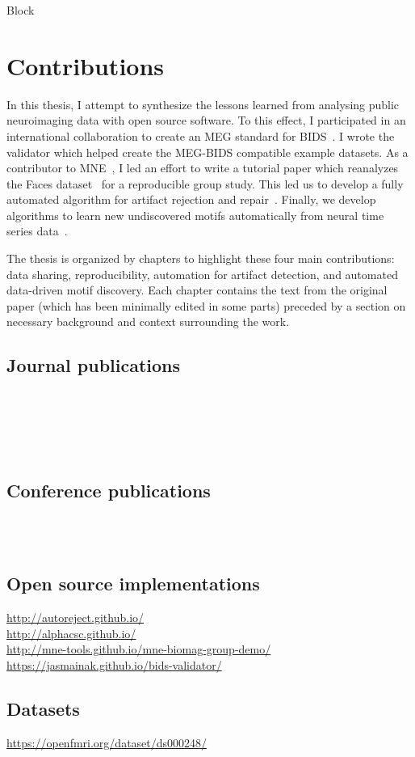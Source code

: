 Block


\section{Contributions}
In this thesis, I attempt to synthesize the lessons learned from analysing public neuroimaging data with open source software. To this effect, I participated in an international collaboration to create an \ac{MEG} standard for  \ac{BIDS}~\citep{galan2017meg}. I wrote the validator which helped create the MEG-BIDS compatible example datasets. As a contributor to MNE~\citep{gramfort2013meg}, I led an effort to write a tutorial paper which reanalyzes the Faces dataset~\citep{wakeman2015multi} for a reproducible group study. This led us to develop a fully automated algorithm for artifact rejection and repair~\citep{jas2016automated, jas2017autoreject}. Finally, we develop algorithms to learn new undiscovered motifs automatically from neural time series data~\citep{jas2017learning}. 

The thesis is organized by chapters to highlight these four main  contributions: data sharing, reproducibility, automation for artifact detection, and automated data-driven motif discovery. Each chapter contains the text from the original paper (which has been minimally edited in some parts) preceded by a section on necessary background and context surrounding the work.

\subsection*{Journal publications}
\ \\ \\
\ \\ \\

\subsection*{Conference publications}
\ \\ \\

\subsection*{Open source implementations}

\url{http://autoreject.github.io/} \\
\url{http://alphacsc.github.io/} \\
\url{http://mne-tools.github.io/mne-biomag-group-demo/} \\
\url{https://jasmainak.github.io/bids-validator/}

\subsection*{Datasets}

\url{https://openfmri.org/dataset/ds000248/}